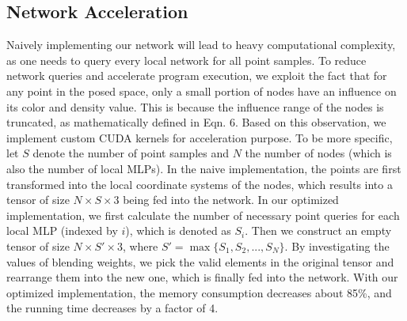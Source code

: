 \subsection{Network Acceleration}
Naively implementing our network will lead to heavy computational complexity, as one needs to query every local network for all point samples. 
To reduce network queries and accelerate program execution, we exploit the fact that for any point in the posed space, only a small portion of nodes have an influence on its color and density value. This is because the influence range of the nodes is truncated, as mathematically defined in Eqn. 6.
Based on this observation, we implement custom CUDA kernels for acceleration purpose. 
To be more specific, let $S$ denote the number of point samples and $N$ the number of nodes (which is also the number of local MLPs). In the naive implementation, the points are first transformed into the local coordinate systems of the nodes, which results into a tensor of size $N\times S \times 3$ being fed into the network. In our optimized implementation, we first calculate the number of necessary point queries for each local MLP (indexed by $i$), which is denoted as $S_i$. 
Then we construct an empty tensor of size $N\times S' \times 3$, where $S' = \max\{S_1, S_2, ..., S_N\}$. By investigating the values of blending weights, we pick the valid elements in the original tensor and rearrange them into the new one, which is finally fed into the network. 
With our optimized implementation, the memory consumption decreases about 85\%, and the running time decreases by a factor of 4. 




